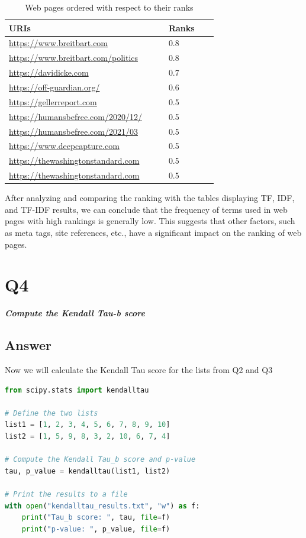 \documentclass[12pt]{article}
\begin{document}
\begin{table}[h]
\centering
\caption{Web pages ordered with respect to their ranks}
\label{tbl:simple}
\begin{tabular}{p{0.50\linewidth}p{0.20\linewidth}}
\hline
\textbf{URIs} & \textbf{Ranks}  \\ \hline \hline
\url{https://www.breitbart.com} & 0.8 \\ \hline \hline
\url{https://www.breitbart.com/politics} & 0.8 \\ \hline \hline
\url{https://davidicke.com} & 0.7 \\ \hline \hline
\url{https://off-guardian.org/} & 0.6 \\ \hline \hline
\url{https://gellerreport.com} & 0.5 \\ \hline \hline
\url{https://humansbefree.com/2020/12/}	 & 0.5 \\ \hline \hline
\url{https://humansbefree.com/2021/03} &	0.5 \\ \hline \hline
\url{https://www.deepcapture.com} & 0.5 \\ \hline \hline
\url{https://thewashingtonstandard.com} & 0.5  \\ \hline \hline
\url{https://thewashingtonstandard.com} & 0.5 \\ \hline \hline




\end{tabular}
\end{table}

After analyzing and comparing the ranking with the tables displaying TF, IDF, and TF-IDF results, we can conclude that the frequency of terms used in web pages with high rankings is generally low. This suggests that other factors, such as meta tags, site references, etc., have a significant impact on the ranking of web pages.
\clearpage

\section*{Q4}

\emph{ \textbf{Compute the Kendall Tau-b score}}

\subsection*{Answer}
Now we will calculate the Kendall Tau score for the lists from Q2 and Q3
\\

\begin{lstlisting}[language=Python, caption=Code for creating local corpus]
from scipy.stats import kendalltau

# Define the two lists
list1 = [1, 2, 3, 4, 5, 6, 7, 8, 9, 10]
list2 = [1, 5, 9, 8, 3, 2, 10, 6, 7, 4]

# Compute the Kendall Tau_b score and p-value
tau, p_value = kendalltau(list1, list2)

# Print the results to a file
with open("kendalltau_results.txt", "w") as f:
    print("Tau_b score: ", tau, file=f)
    print("p-value: ", p_value, file=f)
\end{lstlisting}
\end{document}
